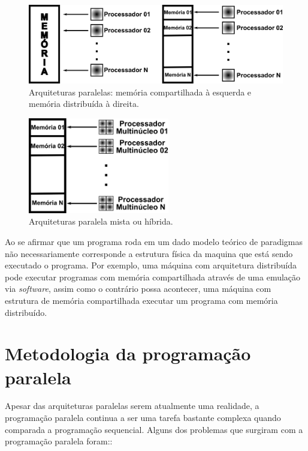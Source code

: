 \begin{figure}[htbp]
	\centering
	\includegraphics[width=1.0\textwidth]{fig/arquiteturas2.png}
	\caption{Arquiteturas paralelas: memória compartilhada à esquerda e memória distribuída à direita.} 
	\label{fig:arquiteturas}
\end{figure}


\begin{figure}[htbp]
	\centering
	\includegraphics[width=0.55\textwidth]{fig/arquitetura_hib.png}
	\caption{Arquiteturas paralela mista ou híbrida.} 
	\label{fig:arquitetura_hib}
\end{figure}


Ao se afirmar que um programa roda em um dado modelo teórico de paradigmas não necessariamente corresponde a estrutura física da maquina que está sendo executado o programa. Por exemplo, uma máquina com arquitetura distribuída pode executar programas com memória compartilhada através de uma emulação via \textit{software}, assim como o contrário possa acontecer, uma máquina com estrutura de memória compartilhada executar um programa com memória distribuído.



\section{Metodologia da programação paralela}

Apesar das arquiteturas paralelas serem atualmente uma realidade, a programação paralela continua a ser uma tarefa bastante complexa quando comparada a programação sequencial. Alguns dos problemas que surgiram com a programação paralela foram::

